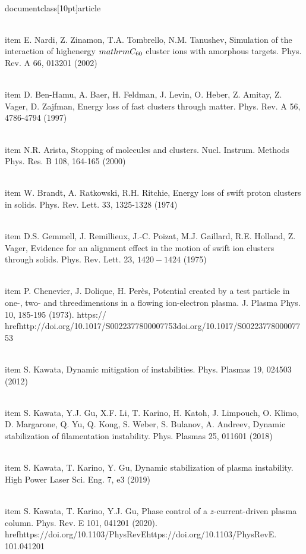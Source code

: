 \\documentclass[10pt]{article}
\begin{document}
{{{{{{  \\item E. Nardi, Z. Zinamon, T.A. Tombrello, N.M. Tanushev, Simulation of the interaction of highenergy $\\mathrm{C}_{60}$ cluster ions with amorphous targets. Phys. Rev. A 66, 013201 (2002)

  \\item D. Ben-Hamu, A. Baer, H. Feldman, J. Levin, O. Heber, Z. Amitay, Z. Vager, D. Zajfman, Energy loss of fast clusters through matter. Phys. Rev. A 56, 4786-4794 (1997)

  \\item N.R. Arista, Stopping of molecules and clusters. Nucl. Instrum. Methods Phys. Res. B 108, 164-165 (2000)

  \\item W. Brandt, A. Ratkowski, R.H. Ritchie, Energy loss of swift proton clusters in solids. Phys. Rev. Lett. 33, 1325-1328 (1974)

  \\item D.S. Gemmell, J. Remillieux, J.-C. Poizat, M.J. Gaillard, R.E. Holland, Z. Vager, Evidence for an alignment effect in the motion of swift ion clusters through solids. Phys. Rev. Lett. 23, $1420-1424$ (1975)

  \\item P. Chenevier, J. Dolique, H. Perès, Potential created by a test particle in one-, two- and threedimensions in a flowing ion-electron plasma. J. Plasma Phys. 10, 185-195 (1973). https:// \\href{http://doi.org/10.1017/S0022377800007753}{doi.org/10.1017/S0022377800007753}

  \\item S. Kawata, Dynamic mitigation of instabilities. Phys. Plasmas 19, 024503 (2012)

  \\item S. Kawata, Y.J. Gu, X.F. Li, T. Karino, H. Katoh, J. Limpouch, O. Klimo, D. Margarone, Q. Yu, Q. Kong, S. Weber, S. Bulanov, A. Andreev, Dynamic stabilization of filamentation instability. Phys. Plasmas 25, 011601 (2018)

  \\item S. Kawata, T. Karino, Y. Gu, Dynamic stabilization of plasma instability. High Power Laser Sci. Eng. 7, e3 (2019)

  \\item S. Kawata, T. Karino, Y.J. Gu, Phase control of a $z$-current-driven plasma column. Phys. Rev. E 101, 041201 (2020). \\href{https://doi.org/10.1103/PhysRevE}{https://doi.org/10.1103/PhysRevE}. 101.041201

}}}}}}
\end{document}
